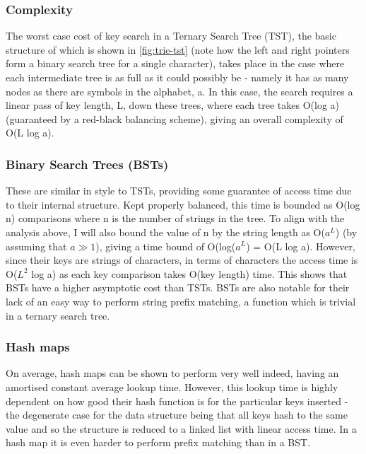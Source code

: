 \documentclass[a4paper,12pt,twoside,openright]{report}
\begin{document}
	\subsubsection{Complexity}
	
	The worst case cost of key search in a Ternary Search Tree (TST), the basic structure of which is shown in \figurename{\ref{fig:trie-tst}} (note how the left and right pointers form a binary search tree for a single character), takes place in the case where each intermediate tree is as full as it could possibly be - namely it has as many nodes as there are symbols in the alphabet, a. In this case, the search requires a linear pass of key length, L, down these trees, where each tree takes O(log a) (guaranteed by a red-black balancing scheme), giving an overall complexity of O(L log a).
	
	\subsubsection{Binary Search Trees (BSTs)}
	
	These are similar in style to TSTs, providing some guarantee of access time due to their internal structure. Kept properly balanced, this time is bounded as O(log n) comparisons where n is the number of strings in the tree. To align with the analysis above, I will also bound the value of n by the string length as O($a^{L}$) (by assuming that $a \gg 1$), giving a time bound of O(log($a^{L}$) = O(L log a). However, since their keys are strings of characters, in terms of characters the access time is O($L^{2}$ log a) as each key comparison takes O(key length) time. This shows that BSTs have a higher asymptotic cost than TSTs. BSTs are also notable for their lack of an easy way to perform string prefix matching, a function which is trivial in a ternary search tree.
	
	\subsubsection{Hash maps}
	
	On average, hash maps can be shown to perform very well indeed, having an amortised constant average lookup time. However, this lookup time is highly dependent on how good their hash function is for the particular keys inserted - the degenerate case for the data structure being that all keys hash to the same value and so the structure is reduced to a linked list with linear access time. In a hash map it is even harder to perform prefix matching than in a BST.
	
\end{document}
